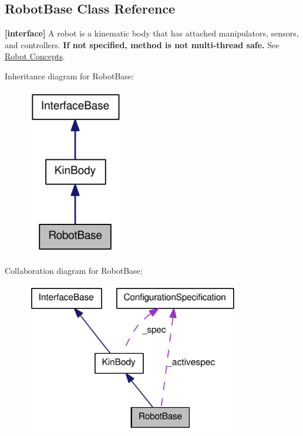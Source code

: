 \hypertarget{classOpenRAVE_1_1RobotBase}{
\subsection{RobotBase Class Reference}
\label{classOpenRAVE_1_1RobotBase}
}


{\bfseries \mbox{[}interface\mbox{]}} A robot is a kinematic body that has attached manipulators, sensors, and controllers. {\bfseries If not specified, method is not multi-\/thread safe.} See \hyperlink{arch__robot}{Robot Concepts}.  




Inheritance diagram for RobotBase:\nopagebreak
\begin{figure}[H]
\begin{center}
\leavevmode
\includegraphics[width=120pt]{classOpenRAVE_1_1RobotBase__inherit__graph}
\end{center}
\end{figure}


Collaboration diagram for RobotBase:\nopagebreak
\begin{figure}[H]
\begin{center}
\leavevmode
\includegraphics[width=266pt]{classOpenRAVE_1_1RobotBase__coll__graph}
\end{center}
\end{figure}
